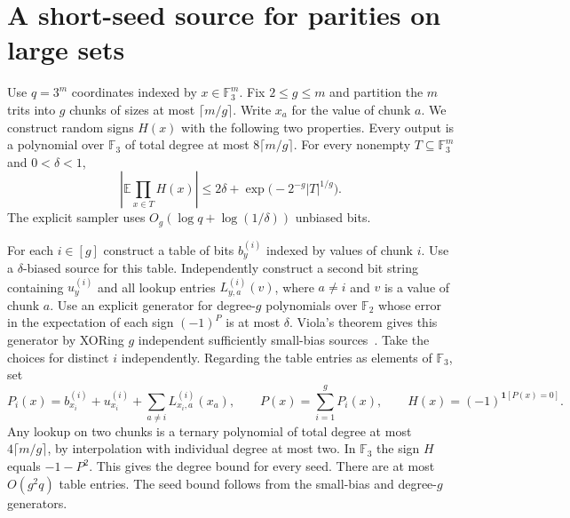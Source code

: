 \documentclass[11pt]{article}
\begin{document}
\section{A short-seed source for parities on large sets}
\label{sec:large-parities}

Use $q=3^m$ coordinates indexed by $x\in\mathbb F_3^m$.
Fix $2\le g\le m$ and partition the $m$ trits into $g$ chunks
of sizes at most $\lceil m/g\rceil$. Write $x_a$ for the value of
chunk $a$. We construct random signs $H(x)$ with the following
two properties. Every output is a polynomial over $\mathbb F_3$
of total degree at most $8\lceil m/g\rceil$. For every nonempty
$T\subseteq\mathbb F_3^m$ and $0<\delta<1$,
\begin{equation}
 \left|\mathbb E\prod_{x\in T}H(x)\right|
 \le 2\delta+\exp\!\bigl(-2^{-g}|T|^{1/g}\bigr).
 \label{eq:large-parity-bound}
\end{equation}
The explicit sampler uses $O_g(\log q+\log(1/\delta))$ unbiased bits.

For each $i\in[g]$ construct a table of bits $b^{(i)}_y$ indexed by
values of chunk $i$. Use a $\delta$-biased source for this table.
Independently construct a second bit string containing $u^{(i)}_y$
and all lookup entries $L^{(i)}_{y,a}(v)$, where $a\ne i$
and $v$ is a value of chunk $a$. Use an explicit generator for
degree-$g$ polynomials over $\mathbb F_2$ whose error in the
expectation of each sign $(-1)^P$ is at most $\delta$.
Viola's theorem gives this generator by XORing $g$ independent
sufficiently small-bias sources~\cite{Viola}.
Take the choices for distinct $i$ independently. Regarding the
table entries as elements of $\mathbb F_3$, set
\[
 P_i(x)= b^{(i)}_{x_i}+u^{(i)}_{x_i}
       +\sum_{a\ne i}L^{(i)}_{x_i,a}(x_a),\qquad
 P(x)=\sum_{i=1}^{g} P_i(x),\qquad
 H(x)=(-1)^{\mathbf 1[P(x)=0]}.
\]
Any lookup on two chunks is a ternary polynomial of total degree at
most $4\lceil m/g\rceil$, by interpolation with individual degree at
most two. In $\mathbb F_3$ the sign $H$ equals $-1-P^2$.
This gives the degree bound for every seed. There are at most
$O(g^2q)$ table entries. The seed bound follows from the small-bias
and degree-$g$ generators.
\end{document}
